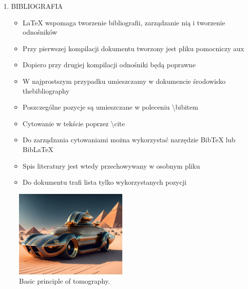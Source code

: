 \documentclass[a4paper,twoside,onecolumn]{report}
\begin{document}
\begin{enumerate}
			\item BIBLIOGRAFIA
			\begin{itemize}
				\item LaTeX wspomaga tworzenie bibliografii, zarządzanie nią i tworzenie odnośników
				\item Przy pierwszej kompilacji dokumentu tworzony jest pliku pomocniczy aux
				\item Dopiero przy drugiej kompilacji odnośniki będą poprawne
				\item W najprostszym przypadku umieszczamy w dokumencie środowisko thebibliography
				\item Poszczególne pozycje są umieszczane w poleceniu \textbackslash bibitem
				\item Cytowanie w tekście poprzez \textbackslash cite
				\item Do zarządzania cytowaniami można wykorzystać narzędzie BibTeX lub BibLaTeX
				\item Spis literatury jest wtedy przechowywany w osobnym pliku
				\item Do dokumentu trafi lista tylko wykorzystanych pozycji
			\end{itemize}

		\end{enumerate}


	\begin{figure}[h]
		\centering
		\includegraphics[width=0.5\textwidth]{picture1.jpg}
		\caption{Basic principle of tomography.}
	\end{figure}
\end{document}
